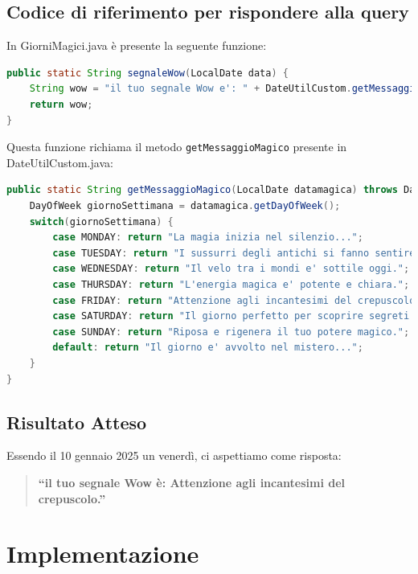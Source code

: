 \documentclass[12pt,a4paper,openright,twoside]{book}
\begin{document}
\subsection{Codice di riferimento per rispondere alla query}
In GiorniMagici.java è presente la seguente funzione:
\begin{lstlisting}[language=Java, caption={Metodo segnaleWow in GiorniMagici.java}, label={lst:segnaleWow}]
public static String segnaleWow(LocalDate data) {
    String wow = "il tuo segnale Wow e': " + DateUtilCustom.getMessaggioMagico(date);
    return wow;
}
\end{lstlisting}
Questa funzione richiama il metodo \texttt{getMessaggioMagico} presente in DateUtilCustom.java:

\begin{lstlisting}[language=Java, caption={Metodo getMessaggioMagico in DateUtilCustom.java}, label={lst:getMessaggioMagico}]
public static String getMessaggioMagico(LocalDate datamagica) throws DateTimeParseException {
    DayOfWeek giornoSettimana = datamagica.getDayOfWeek();
    switch(giornoSettimana) {
        case MONDAY: return "La magia inizia nel silenzio...";
        case TUESDAY: return "I sussurri degli antichi si fanno sentire.";
        case WEDNESDAY: return "Il velo tra i mondi e' sottile oggi.";
        case THURSDAY: return "L'energia magica e' potente e chiara.";
        case FRIDAY: return "Attenzione agli incantesimi del crepuscolo.";
        case SATURDAY: return "Il giorno perfetto per scoprire segreti nascosti.";
        case SUNDAY: return "Riposa e rigenera il tuo potere magico.";
        default: return "Il giorno e' avvolto nel mistero...";
    }
}
\end{lstlisting}

\subsection{Risultato Atteso}
Essendo il 10 gennaio 2025 un venerdì, ci aspettiamo come risposta:
\begin{quote}
    \textbf{``il tuo segnale Wow è: Attenzione agli incantesimi del crepuscolo.''}
\end{quote}

\section{Implementazione}
\end{document}
